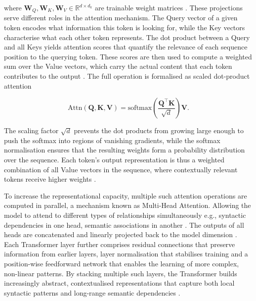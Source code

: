 where $\mathbf{W}_Q, \mathbf{W}_K, \mathbf{W}_V \in \mathbb{R}^{d \times d_k}$ are trainable weight matrices \cite[p. 212 f.]{prince2023understanding}\cite{Vaswani2017}. These projections serve different roles in the attention mechanism. The Query vector of a given token encodes what information this token is looking for, while the Key vectors characterise what each other token represents. The dot product between a Query and all Keys yields attention scores that quantify the relevance of each sequence position to the querying token. These scores are then used to compute a weighted sum over the Value vectors, which carry the actual content that each token contributes to the output \cite[p. 362 f.]{Bishop2024}\cite{Vaswani2017}. The full operation is formalised as scaled dot-product attention

\vspace{-1em}
\[
\mathrm{Attn}(\mathbf{Q},\mathbf{K},\mathbf{V}) = \mathrm{softmax}\!\left(\frac{\mathbf{Q}^\top \mathbf{K}}{\sqrt{d}}\right)\mathbf{V}.
\]
\vspace{-1em}

The scaling factor $\sqrt{d}$ prevents the dot products from growing large enough to push the softmax into regions of vanishing gradients, while the softmax normalisation ensures that the resulting weights form a probability distribution over the sequence. Each token's output representation is thus a weighted combination of all Value vectors in the sequence, where contextually relevant tokens receive higher weights \cite[p. 366 f.]{Bishop2024}\cite[p. 214]{prince2023understanding}\cite{Vaswani2017}.

To increase the representational capacity, multiple such attention operations are computed in parallel, a mechanism known as Multi-Head Attention. Allowing the model to attend to different types of relationships simultaneously e.g., syntactic dependencies in one head, semantic associations in another \cite{rogers_2020_bertology}. The outputs of all heads are concatenated and linearly projected back to the model dimension \cite[p. 366 f.]{Bishop2024}\cite[p. 176 f.]{Jurafsky2024_SLP}\cite{Vaswani2017}. Each Transformer layer further comprises residual connections that preserve information from earlier layers, layer normalisation that stabilises training and a position-wise feedforward network that enables the learning of more complex, non-linear patterns. By stacking multiple such layers, the Transformer builds increasingly abstract, contextualised representations that capture both local syntactic patterns and long-range semantic dependencies \cite[p. 191 f.]{Jurafsky2024_SLP}\cite{Vaswani2017}\cite{rogers_2020_bertology}.

